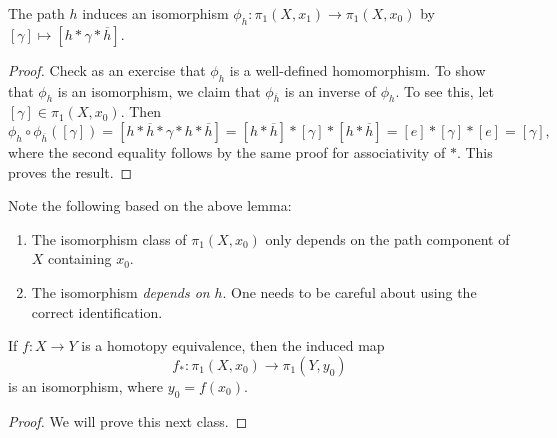 \begin{lemma}
  The path $h$ induces an isomorphism
  $\phi_h : \pi_1(X, x_1) \to \pi_1(X, x_0)$
  by $[\gamma] \mapsto [h * \gamma * \overline{h}]$.
\end{lemma}

\begin{proof}
  Check as an exercise that $\phi_h$ is a well-defined
  homomorphism.
  To show that $\phi_h$ is an isomorphism, we claim
  that $\phi_{\overline{h}}$ is an inverse of $\phi_h$.
  To see this, let $[\gamma] \in \pi_1(X, x_0)$. Then
  \[
    \phi_h \circ \phi_{\overline{h}}([\gamma])
    = [h * \overline{h} * \gamma * h * \overline{h}]
    = [h * \overline{h}] * [\gamma] * [h * \overline{h}]
    = [e] * [\gamma] * [e]
    = [\gamma],
  \]
  where the second equality follows by the same
  proof for associativity of $*$. This proves the result.
\end{proof}

\begin{remark}
  Note the following based on the above lemma:
  \begin{enumerate}
    \item The isomorphism class of $\pi_1(X, x_0)$
      only depends on the path component of $X$
      containing $x_0$.
    \item The isomorphism \emph{depends on} $h$.
      One needs to be careful about using
      the correct identification.
  \end{enumerate}
\end{remark}

\begin{theorem}
  If $f : X \to Y$ is a homotopy equivalence, then
  the induced map
  \[f_* : \pi_1(X, x_0) \to \pi_1(Y, y_0)\] is an
  isomorphism, where $y_0 = f(x_0)$.
\end{theorem}

\begin{proof}
  We will prove this next class.
\end{proof}
